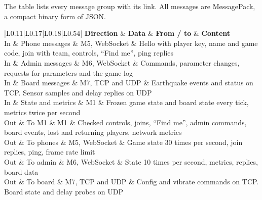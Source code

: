 \documentclass[
  english,
  10pt,
  a4paper,
]{article}
\newcommand{\ckkeep}[1]{\par\noindent\begin{minipage}{\linewidth}\setlength{\parskip}{4pt}#1\end{minipage}\par\smallskip}
\begin{document}

\ckkeep{%
The table lists every message group with its link. All messages are MessagePack, a compact binary
form of JSON.

\begin{tabular}{|L{0.11}|L{0.17}|L{0.18}|L{0.54}|}
\hline \textbf{Direction} & \textbf{Data} & \textbf{From / to} & \textbf{Content} \\ \hline 
In & Phone messages & M5, WebSocket & Hello with player key, name and game code, join with team, controls, ``Find me'', ping replies \\ \hline
In & Admin messages & M6, WebSocket & Commands, parameter changes, requests for parameters and the game log \\ \hline
In & Board messages & M7, TCP and UDP & Earthquake events and status on TCP. Sensor samples and delay replies on UDP \\ \hline
In & State and metrics & M1 & Frozen game state and board state every tick, metrics twice per second \\ \hline
Out & To M1 & M1 & Checked controls, joins, ``Find me'', admin commands, board events, lost and returning players, network metrics \\ \hline
Out & To phones & M5, WebSocket & Game state 30 times per second, join replies, ping, frame rate limit \\ \hline
Out & To admin & M6, WebSocket & State 10 times per second, metrics, replies, board data \\ \hline
Out & To board & M7, TCP and UDP & Config and vibrate commands on TCP. Board state and delay probes on UDP \\ \hline
\end{tabular}}

\end{document}
